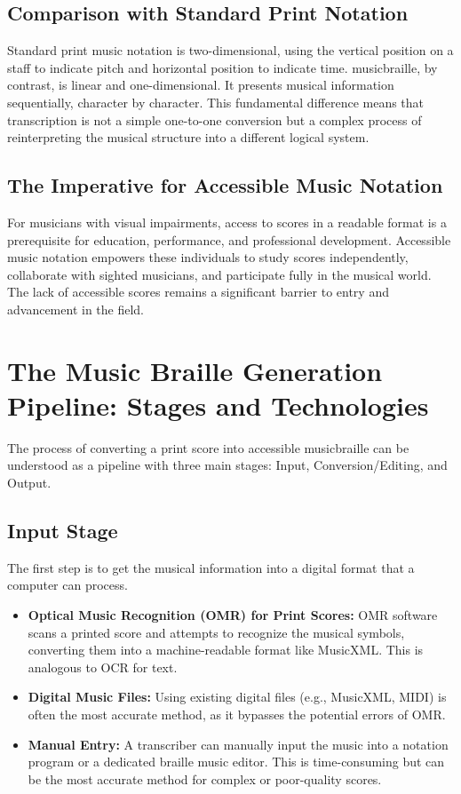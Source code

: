 \subsection{Comparison with Standard Print Notation}\label{ch10:ssec:comparison-with-print}
Standard print music notation is two-dimensional, using the vertical position on a staff to indicate pitch and horizontal position to indicate time. \gls{musicbraille}, by contrast, is linear and one-dimensional. It presents musical information sequentially, character by character. This fundamental difference means that transcription is not a simple one-to-one conversion but a complex process of reinterpreting the musical structure into a different logical system.

\subsection{The Imperative for Accessible Music Notation}\label{ch10:ssec:imperative-for-accessibility}
For musicians with visual impairments, access to scores in a readable format is a prerequisite for education, performance, and professional development. Accessible music notation empowers these individuals to study scores independently, collaborate with sighted musicians, and participate fully in the musical world. The lack of accessible scores remains a significant barrier to entry and advancement in the field.

\section{The Music Braille Generation Pipeline: Stages and Technologies}\label{ch10:sec:pipeline}
The process of converting a print score into accessible \gls{musicbraille} can be understood as a pipeline with three main stages: Input, Conversion/Editing, and Output.

\subsection{Input Stage}\label{ch10:ssec:input-stage}
The first step is to get the musical information into a digital format that a computer can process.
\begin{itemize}
	\item \textbf{Optical Music Recognition (OMR) for Print Scores:} \gls{OMR} software scans a printed score and attempts to recognize the musical symbols, converting them into a machine-readable format like \gls{MusicXML}. This is analogous to \gls{OCR} for text.
	\item \textbf{Digital Music Files:} Using existing digital files (e.g., \gls{MusicXML}, MIDI) is often the most accurate method, as it bypasses the potential errors of \gls{OMR}.
	\item \textbf{Manual Entry:} A transcriber can manually input the music into a notation program or a dedicated braille music editor. This is time-consuming but can be the most accurate method for complex or poor-quality scores.
\end{itemize}

